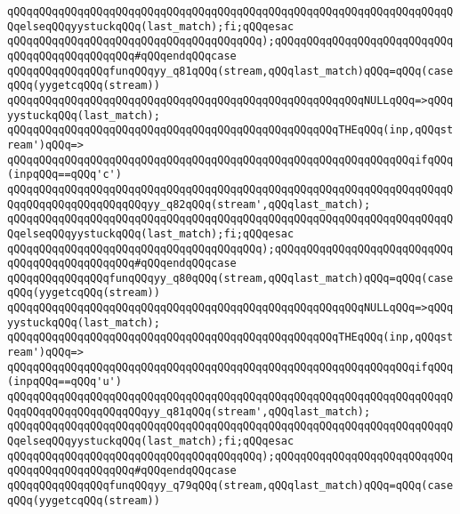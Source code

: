 \verb|qQQqqQQqqQQqqQQqqQQqqQQqqQQqqQQqqQQqqQQqqQQqqQQqqQQqqQQqqQQqqQQqqQQqqQQqelseqQQqyystuckqQQq(last_match);fi;qQQqesac|\newline
\verb|qQQqqQQqqQQqqQQqqQQqqQQqqQQqqQQqqQQqqQQq);qQQqqQQqqQQqqQQqqQQqqQQqqQQqqQQqqQQqqQQqqQQqqQQq#qQQqendqQQqcase|\newline
\verb|qQQqqQQqqQQqqQQqfunqQQqyy_q81qQQq(stream,qQQqlast_match)qQQq=qQQq(caseqQQq(yygetcqQQq(stream))|\newline
\verb|qQQqqQQqqQQqqQQqqQQqqQQqqQQqqQQqqQQqqQQqqQQqqQQqqQQqqQQqNULLqQQq=>qQQqyystuckqQQq(last_match);|\newline
\verb|qQQqqQQqqQQqqQQqqQQqqQQqqQQqqQQqqQQqqQQqqQQqqQQqqQQqTHEqQQq(inp,qQQqstream')qQQq=>|\newline
\verb|qQQqqQQqqQQqqQQqqQQqqQQqqQQqqQQqqQQqqQQqqQQqqQQqqQQqqQQqqQQqqQQqifqQQq(inpqQQq==qQQq'c')|\newline
\verb|qQQqqQQqqQQqqQQqqQQqqQQqqQQqqQQqqQQqqQQqqQQqqQQqqQQqqQQqqQQqqQQqqQQqqQQqqQQqqQQqqQQqqQQqqQQqyy_q82qQQq(stream',qQQqlast_match);|\newline
\verb|qQQqqQQqqQQqqQQqqQQqqQQqqQQqqQQqqQQqqQQqqQQqqQQqqQQqqQQqqQQqqQQqqQQqqQQqelseqQQqyystuckqQQq(last_match);fi;qQQqesac|\newline
\verb|qQQqqQQqqQQqqQQqqQQqqQQqqQQqqQQqqQQqqQQq);qQQqqQQqqQQqqQQqqQQqqQQqqQQqqQQqqQQqqQQqqQQqqQQq#qQQqendqQQqcase|\newline
\verb|qQQqqQQqqQQqqQQqfunqQQqyy_q80qQQq(stream,qQQqlast_match)qQQq=qQQq(caseqQQq(yygetcqQQq(stream))|\newline
\verb|qQQqqQQqqQQqqQQqqQQqqQQqqQQqqQQqqQQqqQQqqQQqqQQqqQQqqQQqNULLqQQq=>qQQqyystuckqQQq(last_match);|\newline
\verb|qQQqqQQqqQQqqQQqqQQqqQQqqQQqqQQqqQQqqQQqqQQqqQQqqQQqTHEqQQq(inp,qQQqstream')qQQq=>|\newline
\verb|qQQqqQQqqQQqqQQqqQQqqQQqqQQqqQQqqQQqqQQqqQQqqQQqqQQqqQQqqQQqqQQqifqQQq(inpqQQq==qQQq'u')|\newline
\verb|qQQqqQQqqQQqqQQqqQQqqQQqqQQqqQQqqQQqqQQqqQQqqQQqqQQqqQQqqQQqqQQqqQQqqQQqqQQqqQQqqQQqqQQqqQQqyy_q81qQQq(stream',qQQqlast_match);|\newline
\verb|qQQqqQQqqQQqqQQqqQQqqQQqqQQqqQQqqQQqqQQqqQQqqQQqqQQqqQQqqQQqqQQqqQQqqQQqelseqQQqyystuckqQQq(last_match);fi;qQQqesac|\newline
\verb|qQQqqQQqqQQqqQQqqQQqqQQqqQQqqQQqqQQqqQQq);qQQqqQQqqQQqqQQqqQQqqQQqqQQqqQQqqQQqqQQqqQQqqQQq#qQQqendqQQqcase|\newline
\verb|qQQqqQQqqQQqqQQqfunqQQqyy_q79qQQq(stream,qQQqlast_match)qQQq=qQQq(caseqQQq(yygetcqQQq(stream))|\newline
